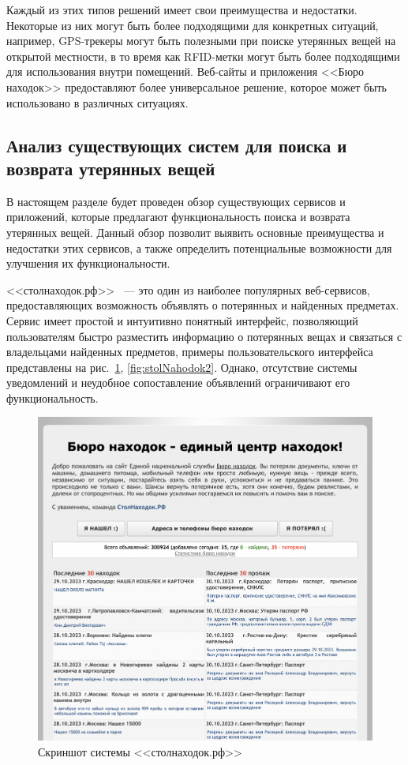 Каждый из этих типов решений имеет свои преимущества и недостатки. Некоторые из них могут быть более подходящими для конкретных ситуаций, например, GPS-трекеры могут быть полезными при поиске утерянных вещей на открытой местности, в то время как RFID-метки могут быть более подходящими для использования внутри помещений. Веб-сайты и приложения <<Бюро находок>> предоставляют более универсальное решение, которое может быть использовано в различных ситуациях.

\subsection{Анализ существующих систем для поиска и возврата утерянных вещей}

В настоящем разделе будет проведен обзор существующих сервисов и приложений, которые предлагают функциональность поиска и возврата утерянных вещей. Данный обзор позволит выявить основные преимущества и недостатки этих сервисов, а также определить потенциальные возможности для улучшения их функциональности.

<<столнаходок.рф>>~\cite{bib:stol_nahodok} --- это один из наиболее популярных веб-сервисов, предоставляющих возможность объявлять о потерянных и найденных предметах. Сервис имеет простой и интуитивно понятный интерфейс, позволяющий пользователям быстро разместить информацию о потерянных вещах и связаться с владельцами найденных предметов, примеры пользовательского интерфейса представлены на рис.~\ref{fig:stolNahodok1}, \ref{fig:stolNahodok2}. Однако, отсутствие системы уведомлений и неудобное сопоставление объявлений ограничивают его функциональность.

\begin{figure}[htb]
	\centering
	\includegraphics[width=.95\textwidth]{images/stolNahodok1}
	\parskip=6pt
	\caption{Скриншот системы <<столнаходок.рф>>}
	\label{fig:stolNahodok1}
\end{figure}


